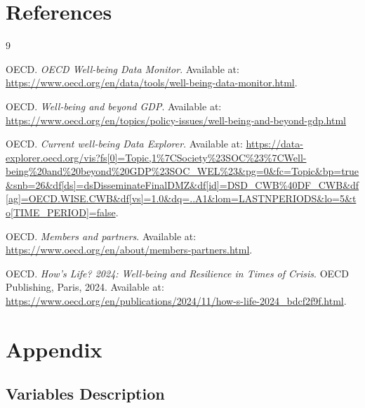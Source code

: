 \documentclass[11pt,a4paper]{article}
\begin{document}
\section{References}

\begin{thebibliography}{9}

OECD. \textit{OECD Well-being Data Monitor}. Available at: \url{https://www.oecd.org/en/data/tools/well-being-data-monitor.html}.

OECD. \textit{Well-being and beyond GDP}. Available at: \url{https://www.oecd.org/en/topics/policy-issues/well-being-and-beyond-gdp.html}

OECD. \textit{Current well-being Data Explorer}. Available at: \url{https://data-explorer.oecd.org/vis?fs[0]=Topic,1%7CSociety%23SOC%23%7CWell-being%20and%20beyond%20GDP%23SOC_WEL%23&pg=0&fc=Topic&bp=true&snb=26&df[ds]=dsDisseminateFinalDMZ&df[id]=DSD_CWB%40DF_CWB&df[ag]=OECD.WISE.CWB&df[vs]=1.0&dq=..A1&lom=LASTNPERIODS&lo=5&to[TIME_PERIOD]=false}.

OECD. \textit{Members and partners}. Available at: \url{https://www.oecd.org/en/about/members-partners.html}.

OECD. \textit{How's Life? 2024: Well-being and Resilience in Times of Crisis}. OECD Publishing, Paris, 2024. Available at: \url{https://www.oecd.org/en/publications/2024/11/how-s-life-2024_bdcf2f9f.html}.



\end{thebibliography}

\appendix
\section{Appendix}

\subsection{Variables Description}
\end{document}
